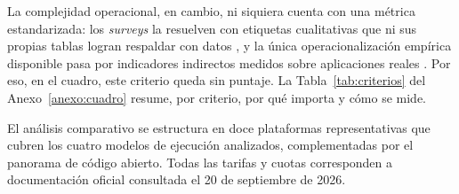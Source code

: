 \documentclass[12pt, letterpaper, table, xcdraw]{inf-pucv}
\begin{document}
La complejidad operacional, en cambio, ni siquiera cuenta con una métrica estandarizada: los \emph{surveys} la resuelven con etiquetas cualitativas que ni sus propias tablas logran respaldar con datos \parencite{castro2019rise}, y la única operacionalización empírica disponible pasa por indicadores indirectos medidos sobre aplicaciones reales \parencite{eismann2021}. Por eso, en el cuadro, este criterio queda sin puntaje. La Tabla~\ref{tab:criterios} del Anexo~\ref{anexo:cuadro} resume, por criterio, por qué importa y cómo se mide.



El análisis comparativo se estructura en doce plataformas representativas que cubren los cuatro modelos de ejecución analizados, complementadas por el panorama de código abierto. Todas las tarifas y cuotas corresponden a documentación oficial consultada el 20 de septiembre de 2026.
\end{document}
